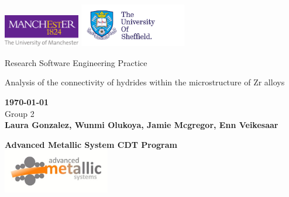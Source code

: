 \documentclass[12pt]{article}
\begin{document}
\onehalfspacing
\thispagestyle{empty} 
\begin{titlepage}
    \centering
    \includegraphics[width=0.25\textwidth]{uom_logo.pdf}
    \hspace{170}
    \includegraphics[width=0.35\textwidth]{Sheffield.pdf}
    \begin{center}
       \vspace*{4cm}
       {\LARGE Research Software Engineering Practice}
       \vspace{3cm}
    \begin{large}   
    

         
         \vspace{0.5cm}

        {\LARGE Analysis of the connectivity of hydrides within the microstructure of Zr alloys} \\

       \vspace{1.5cm}
        
        {\bf \today} \\
                
        
       \vspace{3 cm}
        Group 2 \\
       \textbf{Laura Gonzalez,
       Wunmi Olukoya,
       Jamie Mcgregor, 
       Enn Veikesaar }\\

       \vfill
       \centering
       
        {\bf \large Advanced Metallic System CDT Program}\\
          
        \includegraphics[width=0.35\textwidth]{CDT.jpg}
        
    
    
    \end{large}  
   \end{center}
\end{titlepage}
\newpage 
\thispagestyle{plain} 
\end{document}
